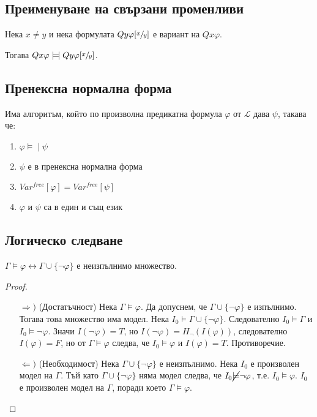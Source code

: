 \documentclass{article}
\newcommand{\mymod}{\models\!\mid}
\def\Proofs{1}
\begin{document}
\subsection*{Преименуване на свързани променливи}

\begin{thm}
Нека $x \neq y$ и нека формулата $Qy\varphi[\sfrac{x}{y}]$ е вариант на $Qx\varphi$.

Тогава $Qx\varphi \mymod Qy\varphi[\sfrac{x}{y}]$.
\end{thm}

\subsection*{Пренексна нормална форма}


\begin{thm}
Има алгоритъм, който по произволна предикатна формула $\varphi$ от $\mathcal{L}$ дава $\psi$, такава че:
\begin{enumerate}
\item $\varphi \mymod \psi$
\item $\psi$ е в пренексна нормална форма
\item $Var^{free}[\varphi] = Var^{free}[\psi]$
\item $\varphi$ и $\psi$ са в един и същ език
\end{enumerate}
\end{thm}

\subsection*{Логическо следване}

\begin{thm}
$\Gamma \models \varphi \longleftrightarrow \Gamma \cup \{\neg\varphi\}$ е неизпълнимо множество.

\ifcase\Proofs\or
\begin{proof}
$\ $
\begin{itemize}
\item[$\Rightarrow)$] (Достатъчност) Нека $\Gamma \models \varphi$. Да допуснем, че $\Gamma \cup \{\neg\varphi\}$ е изпълнимо. Тогава това множество има модел. Нека $I_0 \models \Gamma \cup \{\neg\varphi\}$. Следователно $I_0 \models \Gamma$ и $I_0 \models \neg\varphi$. Значи $I(\neg\varphi) = T$, но $I(\neg\varphi) = H_\neg(I(\varphi))$, следователно $I(\varphi) = F$, но от $\Gamma \models \varphi$ следва, че $I_0 \models \varphi$  и $I(\varphi) = T$. Противоречие.
\item[$\Leftarrow)$] (Необходимост) Нека $\Gamma \cup \{\neg\varphi\}$ е неизпълнимо. Нека $I_0$ е произволен модел на $\Gamma$. Тъй като $\Gamma \cup \{\neg\varphi\}$ няма модел следва, че 	$I_0 \cancel{\models} \neg\varphi$, т.е. $I_0 \models \varphi$. $I_0$ е произволен модел на $\Gamma$, поради което $\Gamma \models \varphi$.
\end{itemize}
\end{proof}
\fi

\end{thm}
\end{document}
